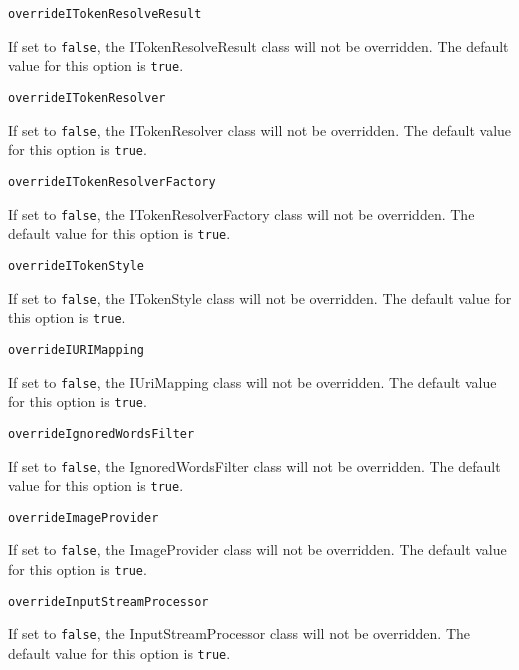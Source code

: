 \noindent\texttt{overrideITokenResolveResult}
\begin{myindentpar}{1cm}
If set to \texttt{false}, the ITokenResolveResult class will not be overridden. The default value for this option is \texttt{true}.
\end{myindentpar}

\noindent\texttt{overrideITokenResolver}
\begin{myindentpar}{1cm}
If set to \texttt{false}, the ITokenResolver class will not be overridden. The default value for this option is \texttt{true}.
\end{myindentpar}

\noindent\texttt{overrideITokenResolverFactory}
\begin{myindentpar}{1cm}
If set to \texttt{false}, the ITokenResolverFactory class will not be overridden. The default value for this option is \texttt{true}.
\end{myindentpar}

\noindent\texttt{overrideITokenStyle}
\begin{myindentpar}{1cm}
If set to \texttt{false}, the ITokenStyle class will not be overridden. The default value for this option is \texttt{true}.
\end{myindentpar}

\noindent\texttt{overrideIURIMapping}
\begin{myindentpar}{1cm}
If set to \texttt{false}, the IUriMapping class will not be overridden. The default value for this option is \texttt{true}.
\end{myindentpar}

\noindent\texttt{overrideIgnoredWordsFilter}
\begin{myindentpar}{1cm}
If set to \texttt{false}, the IgnoredWordsFilter class will not be overridden. The default value for this option is \texttt{true}.
\end{myindentpar}

\noindent\texttt{overrideImageProvider}
\begin{myindentpar}{1cm}
If set to \texttt{false}, the ImageProvider class will not be overridden. The default value for this option is \texttt{true}.
\end{myindentpar}

\noindent\texttt{overrideInputStreamProcessor}
\begin{myindentpar}{1cm}
If set to \texttt{false}, the InputStreamProcessor class will not be overridden. The default value for this option is \texttt{true}.
\end{myindentpar}

